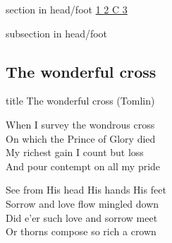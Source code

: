\documentclass[aspectratio=169]{beamer}
\begin{document}
{
{ 
 {
 \begin{beamercolorbox}[ht=4.5ex,dp=1.5ex,%
      leftskip=.3cm,rightskip=.3cm plus1fil]{section in head/foot}
 \fontsize{12}{25}\selectfont 
\hyperlink{The wonderful cross['When I survey'](Tomlin)1}{1  }\hyperlink{The wonderful cross['When I survey'](Tomlin)2}{2  }\hyperlink{The wonderful cross['When I survey'](Tomlin)C}{C  }\hyperlink{The wonderful cross['When I survey'](Tomlin)3}{3  } 
 \end{beamercolorbox}%
  \begin{beamercolorbox}[ht=2.5ex,dp=1.125ex,%
   leftskip=.3cm,rightskip=.3cm plus1fil]{subsection in head/foot}
   \insertauthor
 \end{beamercolorbox}%
 }
}
\subsection{The wonderful cross}
\hypertarget{The wonderful cross['When I survey'](Tomlin)}{}
\begin{frame}{}
 \vfill
  \centering
  \begin{beamercolorbox}[sep=8pt,center,shadow=true,rounded=true]{title}
    The wonderful cross (Tomlin)    
  \end{beamercolorbox}
  \vfill
\end{frame}

\hypertarget{The wonderful cross['When I survey'](Tomlin)1}{}
\begin{frame}{}
\fontsize{25.0}{30.0}\selectfont

When I survey the wondrous cross\\ 
On which the Prince of Glory died\\ 
My richest gain I count but loss\\ 
And pour contempt on all my pride

\end{frame}
\hypertarget{The wonderful cross['When I survey'](Tomlin)2}{}
\begin{frame}{}
\fontsize{25.0}{30.0}\selectfont

See from His head His hands His feet\\ 
Sorrow and love flow mingled down\\ 
Did e'er such love and sorrow meet\\ 
Or thorns compose so rich a crown


\end{frame}}
\end{document}
